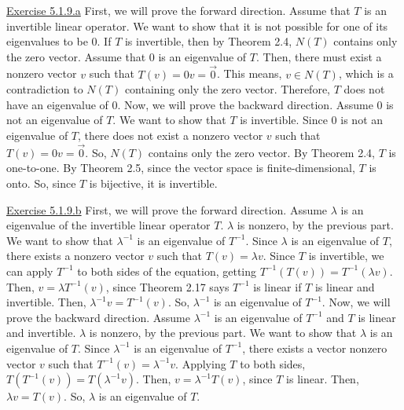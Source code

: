 \documentclass{exam}
\begin{document}
\underline{Exercise 5.1.9.a}
\newline
\newline
First, we will prove the forward direction. Assume that $T$ is an invertible linear operator. We want to show that it is not possible for one of its eigenvalues to be 0. If $T$ is invertible, then by Theorem 2.4, $N(T)$ contains only the zero vector. Assume that 0 is an eigenvalue of $T$. Then, there must exist a nonzero vector $v$ such that $T(v)=0v=\vec{0}$. This means, $v\in N(T)$, which is a contradiction to $N(T)$ containing only the zero vector. Therefore, $T$ does not have an eigenvalue of 0.
\newline
\newline
Now, we will prove the backward direction. Assume 0 is not an eigenvalue of $T$. We want to show that $T$ is invertible. Since 0 is not an eigenvalue of $T$, there does not exist a nonzero vector $v$ such that $T(v)=0v=\vec{0}$. So, $N(T)$ contains only the zero vector. By Theorem 2.4, $T$ is one-to-one. By Theorem 2.5, since the vector space is finite-dimensional, $T$ is onto. So, since $T$ is bijective, it is invertible.
\newline

\underline{Exercise 5.1.9.b}
\newline
\newline
First, we will prove the forward direction. Assume $\lambda$ is an eigenvalue of the invertible linear operator $T$. $\lambda$ is nonzero, by the previous part. We want to show that $\lambda^{-1}$ is an eigenvalue of $T^{-1}$. Since $\lambda$ is an eigenvalue of $T$, there exists a nonzero vector $v$ such that $T(v)=\lambda v$. Since $T$ is invertible, we can apply $T^{-1}$ to both sides of the equation, getting $T^{-1}(T(v))=T^{-1}(\lambda v)$. Then, $v=\lambda T^{-1}(v)$, since Theorem 2.17 says $T^{-1}$ is linear if $T$ is linear and invertible. Then, $\lambda^{-1}v=T^{-1}(v)$. So, $\lambda^{-1}$ is an eigenvalue of $T^{-1}$.
\newline
\newline
Now, we will prove the backward direction. Assume $\lambda^{-1}$ is an eigenvalue of $T^{-1}$ and $T$ is linear and invertible. $\lambda$ is nonzero, by the previous part. We want to show that $\lambda$ is an eigenvalue of $T$. Since $\lambda^{-1}$ is an eigenvalue of $T^{-1}$, there exists a vector nonzero vector $v$ such that $T^{-1}(v)=\lambda^{-1}v$. Applying $T$ to both sides, $T(T^{-1}(v))=T(\lambda^{-1}v)$. Then, $v=\lambda^{-1}T(v)$, since $T$ is linear. Then, $\lambda v=T(v)$. So, $\lambda$ is an eigenvalue of $T$.
\newline
\end{document}
